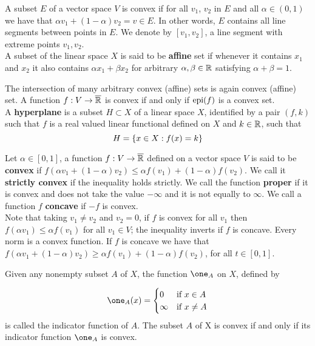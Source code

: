 A subset $E$ of a vector space $V$ is convex if for all $v_1$, $v_2$ in $E$ and all $\alpha \in (0,1)$ we have that $\alpha v_1+(1-\alpha)v_2=v\in E$.
In other words, $E$ contains all line segments between points in $E$. We denote by $[v_1, v_2]$, a line segment with extreme points $v_1, v_2$.\\
A subset of the linear space $X$ is said to be \textbf{affine} set if whenever it contains $x_1$ and $x_2$ it also contains $\alpha x_1+\beta x_2$ for arbitrary $\alpha, \beta \in \mathbb{R}$ satisfying $\alpha+\beta=1$.

The intersection of many arbitrary convex (affine) sets is again convex (affine) set. A function $f: V \rightarrow \overline{\mathbb{R}}$ is convex if and only if $\mathrm{epi}(f)$ is a convex set.\\

A \textbf{hyperplane} is a subset $H\subset X$ of a linear space $X$, identified by a pair $(f, k)$ such that $f$ is a real valued linear functional defined on $X$ and $k\in \mathbb{R}$, such that
\begin{equation}
	H=\left\lbrace x\in X: f(x)=k \right\rbrace
\end{equation}

Let $\alpha\in [0,1]$, a function $f:V\rightarrow \overline{\mathbb{R}}$ defined on a vector space $V$ is said to be \textbf{convex} if $f(\alpha v_1+(1-\alpha)v_2)\leq \alpha f(v_1)+(1-\alpha)f(v_2)$. We call it \textbf{strictly convex} if the inequality holds strictly. We call the function \textbf{proper} if it is convex and does not take the value $-\infty$ and it is not equally to $\infty$. We call a function $f$ \textbf{concave} if $-f$ is convex. \\

Note that taking $v_1\neq v_2$ and $v_2=0$, if $f$ is convex for all $v_1$ then $f(\alpha v_1)\leq \alpha f(v_1)$ for all $v_1\in V$; the inequality inverts if $f$ is concave. Every norm is a convex function. If $f$ is concave we have that $f(\alpha v_1+(1-\alpha)v_2)\geq \alpha f(v_1)+(1-\alpha)f(v_2)$, for all $t\in [0,1]$.

Given any nonempty subset $A$ of $X$, the function $\one_A$ on $X$, defined by

\begin{equation*}
	\one_A(x)=\begin{cases}
	0 & \text{if } x \in A\\
	\infty & \text{if } x \neq A
	\end{cases}
\end{equation*}
is called the indicator function of $A$. The subset $A$ of X is convex if and only if its indicator function $\one_A$ is convex.

